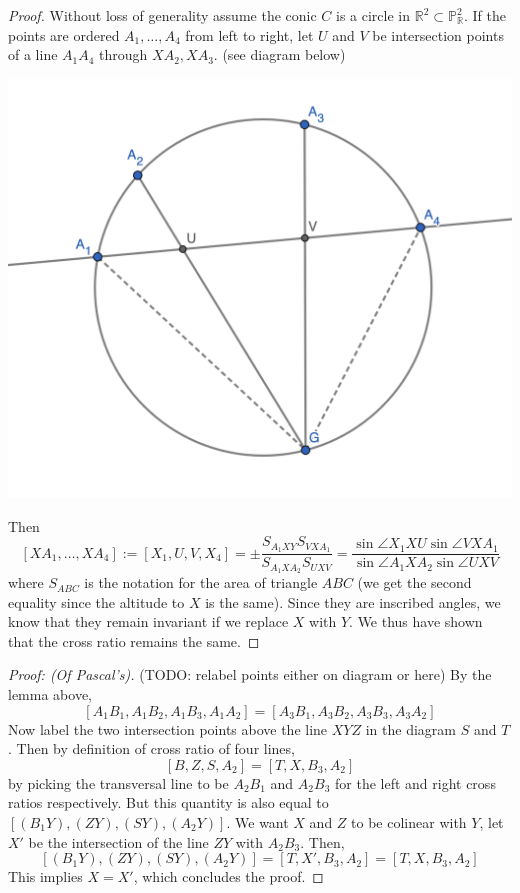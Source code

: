 \documentclass[12pt]{article}
\newcommand{\R}{\mathbb{R}}
\renewcommand{\P}{\mathbb{P}}
\begin{document}
    \begin{proof}
        Without loss of generality assume the conic $C$ is a circle in $\R^2 \subset \P_\R^2$. If the points are ordered $A_1, \dots, A_4$ from left to right, let $U$ and $V$ be intersection points of a line $A_1A_4$ through $XA_2, XA_3$. (see diagram below)
        \begin{center}
            \includegraphics[width = 0.6\linewidth]{chasles.png}
        \end{center}
        Then
        $$[XA_1, \dots, XA_4] := [X_1, U, V, X_4] = \pm \frac{S_{A_1XY} S_{VXA_1}}{S_{A_1XA_2}S_{UXV}} = \frac{\sin \angle X_1XU \sin \angle VXA_1}{\sin \angle A_1XA_2 \sin \angle UXV}$$
        where $S_{ABC}$ is the notation for the area of triangle $ABC$ (we get the second equality since the altitude to $X$ is the same). Since they are inscribed angles, we know that they remain invariant if we replace $X$ with $Y$. We thus have shown that the cross ratio remains the same. 
    \end{proof}
    \begin{proof}
        [Proof: (Of Pascal's)] (TODO: relabel points either on diagram or here) By the lemma above, 
        $$[A_1B_1, A_1B_2, A_1B_3, A_1A_2] = [A_3B_1, A_3B_2, A_3B_3, A_3A_2]$$
        Now label the two intersection points above the line $XYZ$ in the diagram $S$ and $T$. Then by definition of cross ratio of four lines, 
        $$[B, Z, S, A_2] = [T, X, B_3, A_2]$$
        by picking the transversal line to be $A_2B_1$ and $A_2B_3$ for the left and right cross ratios respectively. But this quantity is also equal to $[(B_1Y), (ZY), (SY), (A_2Y)]$. We want $X$ and $Z$ to be colinear with $Y$, let $X'$ be the intersection of the line $ZY$ with $A_2B_3$. Then, 
        $$[(B_1Y), (ZY), (SY), (A_2Y)] = [T, X', B_3, A_2] = [T, X, B_3, A_2]$$
        This implies $X = X'$, which concludes the proof. 
    \end{proof}
\end{document}
